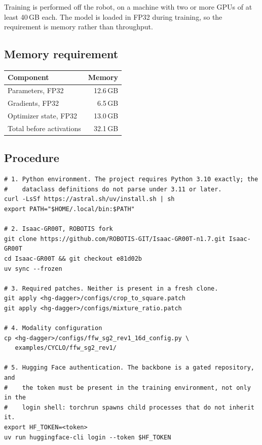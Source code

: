 \documentclass[11pt,a4paper]{article}
\begin{document}
Training is performed off the robot, on a machine with two or more GPUs of at
least 40\,GB each. The model is loaded in FP32 during training, so the
requirement is memory rather than throughput.

\subsection{Memory requirement}

\begin{center}
\small
\begin{tabular}{@{}lr@{}}
\toprule
\textbf{Component} & \textbf{Memory}\\
\midrule
Parameters, FP32              & 12.6\,GB\\
Gradients, FP32               & 6.5\,GB\\
Optimizer state, FP32         & 13.0\,GB\\
\midrule
Total before activations      & 32.1\,GB\\
\bottomrule
\end{tabular}
\end{center}

\subsection{Procedure}

\begin{lstlisting}[style=sh]
# 1. Python environment. The project requires Python 3.10 exactly; the
#    dataclass definitions do not parse under 3.11 or later.
curl -LsSf https://astral.sh/uv/install.sh | sh
export PATH="$HOME/.local/bin:$PATH"

# 2. Isaac-GR00T, ROBOTIS fork
git clone https://github.com/ROBOTIS-GIT/Isaac-GR00T-n1.7.git Isaac-GR00T
cd Isaac-GR00T && git checkout e81d02b
uv sync --frozen

# 3. Required patches. Neither is present in a fresh clone.
git apply <hg-dagger>/configs/crop_to_square.patch
git apply <hg-dagger>/configs/mixture_ratio.patch

# 4. Modality configuration
cp <hg-dagger>/configs/ffw_sg2_rev1_16d_config.py \
   examples/CYCLO/ffw_sg2_rev1/

# 5. Hugging Face authentication. The backbone is a gated repository, and
#    the token must be present in the training environment, not only in the
#    login shell: torchrun spawns child processes that do not inherit it.
export HF_TOKEN=<token>
uv run huggingface-cli login --token $HF_TOKEN
\end{lstlisting}
\end{document}
